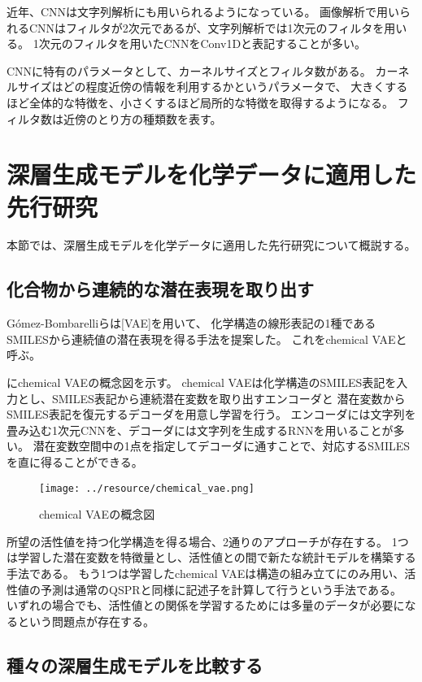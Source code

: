 近年、CNNは文字列解析にも用いられるようになっている。
画像解析で用いられるCNNはフィルタが2次元であるが、文字列解析では1次元のフィルタを用いる。
1次元のフィルタを用いたCNNをConv1Dと表記することが多い。

CNNに特有のパラメータとして、カーネルサイズとフィルタ数がある。
カーネルサイズはどの程度近傍の情報を利用するかというパラメータで、
大きくするほど全体的な特徴を、小さくするほど局所的な特徴を取得するようになる。
フィルタ数は近傍のとり方の種類数を表す。

\section{深層生成モデルを化学データに適用した先行研究}

本節では、深層生成モデルを化学データに適用した先行研究について概説する。

\subsection{化合物から連続的な潜在表現を取り出す}

G\'{o}mez-Bombarelliらは[VAE]を用いて、
化学構造の線形表記の1種であるSMILESから連続値の潜在表現を得る手法を提案した\cite{Gomez-Bombarelli2016}。
これをchemical VAEと呼ぶ。

にchemical VAEの概念図を示す。
chemical VAEは化学構造のSMILES表記を入力とし、SMILES表記から連続潜在変数を取り出すエンコーダと
潜在変数からSMILES表記を復元するデコーダを用意し学習を行う。
エンコーダには文字列を畳み込む1次元CNNを、デコーダには文字列を生成するRNNを用いることが多い。
潜在変数空間中の1点を指定してデコーダに通すことで、対応するSMILESを直に得ることができる。
\begin{figure}[tbp]
    \centering
    \texttt{[image: ../resource/chemical\_vae.png]}
    \caption{chemical VAEの概念図} \label{fig:chemical_vae}
\end{figure}

所望の活性値を持つ化学構造を得る場合、2通りのアプローチが存在する。
1つは学習した潜在変数を特徴量とし、活性値との間で新たな統計モデルを構築する手法である。
もう1つは学習したchemical VAEは構造の組み立てにのみ用い、活性値の予測は通常のQSPRと同様に記述子を計算して行うという手法である。
いずれの場合でも、活性値との関係を学習するためには多量のデータが必要になるという問題点が存在する。

\subsection{種々の深層生成モデルを比較する}

